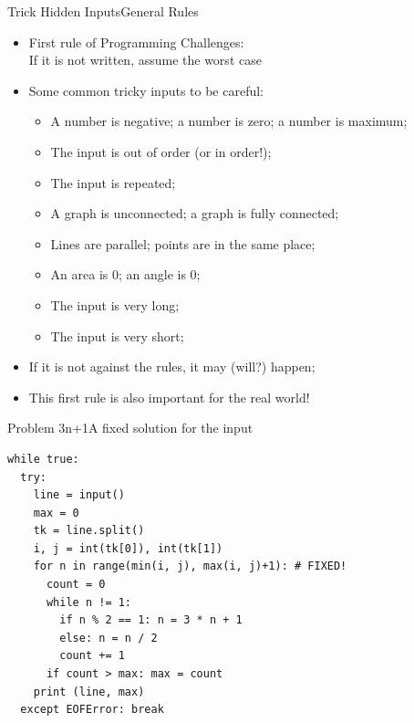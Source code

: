 \begin{frame}{Trick Hidden Inputs}{General Rules}

  \begin{itemize}
    \item First rule of Programming Challenges:\\
      \hspace{1cm}\alert{If it is not written, assume the worst case}
    \bigskip

    \item Some common tricky inputs to be careful:
    \begin{itemize}
      \item A number is negative; a number is zero; a number is maximum;
      \item The input is out of order (or in order!);
      \item The input is repeated;
      \smallskip

      \item A graph is unconnected; a graph is fully connected;
      \item Lines are parallel; points are in the same place;
      \item An area is 0; an angle is 0;
      \smallskip

      \item The input is very long;
      \item The input is very short;
    \end{itemize}
    \bigskip

    \item If it is not against the rules, it may (will?) happen;
    \item This first rule is also important for the real world!
  \end{itemize}
\end{frame}

\begin{frame}[fragile]{Problem 3n+1}{A fixed solution for the input}
\begin{verbatim}
while true:
  try:
    line = input()
    max = 0
    tk = line.split()
    i, j = int(tk[0]), int(tk[1])
    for n in range(min(i, j), max(i, j)+1): # FIXED!
      count = 0
      while n != 1:
        if n % 2 == 1: n = 3 * n + 1
        else: n = n / 2
        count += 1
      if count > max: max = count
    print (line, max)
  except EOFError: break
\end{verbatim}
\end{frame}

